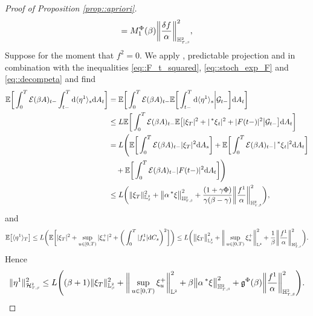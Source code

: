 \documentclass[10pt]{article} %
\newcommand\cE{\mathcal E}
\newcommand\cG{\mathcal G}
\newcommand\cH{\mathcal H}
\newcommand{\smalltext}[1]{\text{\fontsize{4}{4}\selectfont$#1$}}
\newcommand\fg{\mathfrak g}
\def \E{\mathbb{E}}
\def \H{\mathbb{H}}
\def \L{\mathbb{L}}
\newcommand{\brs}[1]{\prescript{\ast}{}{#1}}
\def\d{\mathrm{d}}
\begin{document}
\begin{proof}[Proof of Proposition \ref{prop::apriori}]
\begin{equation*}
	= M^\Phi_1(\beta)\bigg\| \frac{\delta f}{\alpha} \bigg\|^2_{\H^{\smalltext{2}}_{\smalltext{T}\smalltext{,}\smalltext{\beta}}},
\end{equation*}
Suppose for the moment that $f^2 = 0$. We apply , predictable projection and \cite[Theorem VI.57]{dellacherie1982probabilities} in combination with the inequalities \eqref{eq::F_t_squared}, \eqref{eq::stoch_exp_F} and \eqref{eq::decompeta} and find
\begin{align*}
	\E \bigg[ \int_0^T \cE(\beta A)_{t-} \int_{t-}^T \d \langle \eta^1 \rangle_s \d A_t \bigg] 
	&= \E \bigg[ \int_0^T \cE(\beta A)_{t-} \E \bigg[ \int_{t-}^T \d \langle\eta^1\rangle_s \bigg| \cG_{t-} \bigg] \d A_t \bigg] \\
	&\leq L \E\bigg[ \int_0^T \cE(\beta A)_{t-} \E\big[ |\xi_T|^2 + |\brs{\xi}_t|^2 + |F(t-)|^2 \big| \cG_{t-} \big]  \d A_t \bigg] \\
	&= L \Bigg(\E\bigg[ \int_0^T \cE(\beta A)_{t-} |\xi_T|^2 \d A_s \bigg] + \E\bigg[ \int_0^T \cE(\beta A)_{t-} |\brs{\xi}_t|^2 \d A_t \bigg]  \\
	&\quad+ \E\bigg[\int_0^T \cE(\beta A)_{t-} |F(t-)|^2   \d A_t \bigg] \Bigg) \\
	&\leq L \bigg( \|\xi_T\|^2_{\L^\smalltext{2}_\smalltext{\beta}} + \big\|\alpha \brs{\xi} \big\|_{\H^\smalltext{2}_{\smalltext{T}\smalltext{,}\smalltext{\beta}}}^2 + \frac{(1+\gamma\Phi)}{\gamma(\beta - \gamma)} \bigg\| \frac{f^1}{\alpha} \bigg\|_{\H^{\smalltext{2}}_{\smalltext{T}\smalltext{,} \smalltext{\beta}}}^2 \bigg),
\end{align*}
and
\begin{equation*}
		\E \big[ \langle\eta^1\rangle_T \big] \leq L\bigg( \E\bigg[ |\xi_T|^2 +  \sup_{u \in [0,T)} |\xi^+_u|^2 + \bigg(\int_0^T |f^1_s| \d C_s\bigg)^2  \bigg] \bigg) 
		\leq L \bigg( \big\|\xi_T \big\|^2_{\L^\smalltext{2}_\smalltext{\beta}} + \bigg\|\sup_{u \in [0,T)}\xi^+_u\bigg\|^2_{\L^\smalltext{2}} + \frac{1}{\beta} \bigg\| \frac{f^1}{\alpha} \bigg\|^2_{\H^{\smalltext{2}}_{\smalltext{T}\smalltext{,}\smalltext{\beta}}} \bigg).
\end{equation*}
Hence
\begin{equation*}
	\|\eta^1\|^2_{\cH^\smalltext{2}_{\smalltext{T}\smalltext{,}\smalltext{\beta}}} 
	\leq L \Bigg( (\beta + 1) \|\xi_T\|^2_{\L^\smalltext{2}_\smalltext{\beta}} +\bigg\|\sup_{u \in [0,T)} \xi^+_u\bigg\|^2_{\L^\smalltext{2}} + \beta \big\|\alpha \brs{\xi} \big\|_{\H^\smalltext{2}_{\smalltext{T}\smalltext{,}\smalltext{\beta}}}^2 + \fg^\Phi(\beta)\bigg\| \frac{f^1}{\alpha} \bigg\|^2_{\H^{\smalltext{2}}_{\smalltext{T}\smalltext{,}\smalltext{\beta}}}\Bigg).
\end{equation*}
		

\end{proof}
\end{document}
